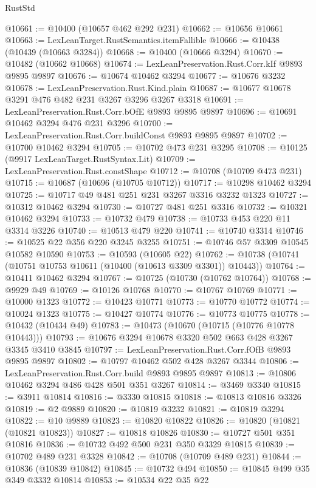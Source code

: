 \begin{lexlean}{RustStd}
\begin{coremodule}
@10661 := @10400 (@10657 @462 @292 @231)
@10662 := @10656 @10661
@10663 := LexLeanTarget.RustSemantics.itemFallible
@10666 := @10438 (@10439 (@10663 @3284))
@10668 := @10400 (@10666 @3294)
@10670 := @10482 (@10662 @10668)
@10674 := LexLeanPreservation.Rust.Corr.kIf @9893 @9895 @9897
@10676 := @10674 @10462 @3294
@10677 := @10676 @3232
@10678 := LexLeanPreservation.Rust.Kind.plain
@10687 := @10677 @10678 @3291 @476 @482 @231 @3267 @3296 @3267 @3318
@10691 := LexLeanPreservation.Rust.Corr.bOfE @9893 @9895 @9897
@10696 := @10691 @10462 @3294 @476 @231 @3296
@10700 := LexLeanPreservation.Rust.Corr.buildConst @9893 @9895 @9897
@10702 := @10700 @10462 @3294
@10705 := @10702 @473 @231 @3295
@10708 := @10125 (@9917 LexLeanTarget.RustSyntax.Lit)
@10709 := LexLeanPreservation.Rust.constShape
@10712 := @10708 (@10709 @473 @231)
@10715 := @10687 (@10696 (@10705 @10712))
@10717 := @10298 @10462 @3294
@10725 := @10717 @49 @481 @251 @231 @3267 @3316 @3232 @1323
@10727 := @10312 @10462 @3294
@10730 := @10727 @481 @251 @3316
@10732 := @10321 @10462 @3294
@10733 := @10732 @479
@10738 := @10733 @453 @220 @11 @3314 @3226
@10740 := @10513 @479 @220
@10741 := @10740 @3314
@10746 := @10525 @22 @356 @220 @3245 @3255
@10751 := @10746 @57 @3309 @10545 @10582 @10590
@10753 := @10593 (@10605 @22)
@10762 := @10738 (@10741 (@10751 @10753 @10611 (@10400 (@10613 @3309 @3301)) @10443))
@10764 := @10411 @10462 @3294
@10767 := @10725 (@10730 (@10762 @10764))
@10768 := @9929 @49
@10769 := @10126 @10768
@10770 := @10767 @10769
@10771 := @10000 @1323
@10772 := @10423 @10771
@10773 := @10770 @10772
@10774 := @10024 @1323
@10775 := @10427 @10774
@10776 := @10773 @10775
@10778 := @10432 (@10434 @49)
@10783 := @10473 (@10670 (@10715 (@10776 @10778 @10443)))
@10793 := @10676 @3294 @10678 @3320 @502 @663 @428 @3267 @3345 @3410 @3845
@10797 := LexLeanPreservation.Rust.Corr.fOfB @9893 @9895 @9897
@10802 := @10797 @10462 @502 @428 @3267 @3344
@10806 := LexLeanPreservation.Rust.Corr.build @9893 @9895 @9897
@10813 := @10806 @10462 @3294 @486 @428 @501 @351 @3267
@10814 := @3469 @3340
@10815 := @3911 @10814
@10816 := @3330 @10815
@10818 := @10813 @10816 @3326
@10819 := @2 @9889
@10820 := @10819 @3232
@10821 := @10819 @3294
@10822 := @10 @9889
@10823 := @10820 @10822
@10826 := @10820 (@10821 (@10821 @10823))
@10827 := @10818 @10826
@10830 := @10727 @501 @351 @10816
@10836 := @10732 @492 @500 @231 @350 @3329 @10815
@10839 := @10702 @489 @231 @3328
@10842 := @10708 (@10709 @489 @231)
@10844 := @10836 (@10839 @10842)
@10845 := @10732 @494
@10850 := @10845 @499 @35 @349 @3332 @10814
@10853 := @10534 @22 @35 @22

\end{coremodule}
\end{lexlean}
